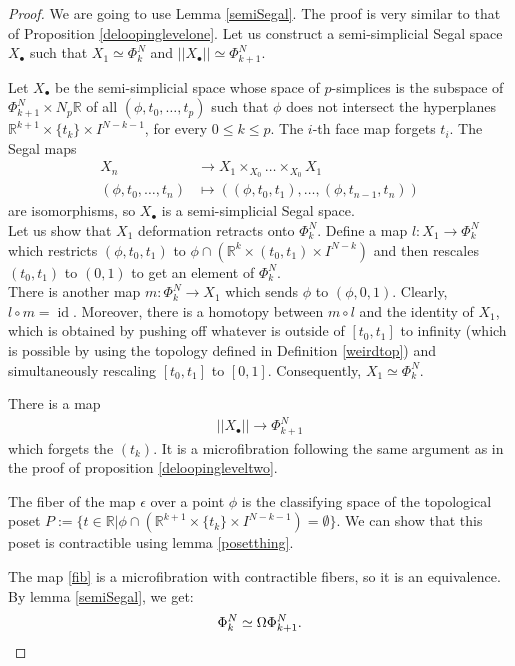 \documentclass[12pt]{amsart}
\theoremstyle{plain}
\newtheorem{lem}[teo]{Lemma}
\theoremstyle{definition}
\theoremstyle{remark}
\DeclareMathOperator{\id}{id}
\begin{document}
\begin{proof}
We are going to use Lemma \ref{semiSegal}.
The proof is very similar to that of Proposition \ref{deloopinglevelone}.
Let us construct a semi-simplicial Segal space $X_\bullet$ such that $X_1\simeq \Phi_{k}^N$ and $\vert\vert X_\bullet\vert\vert \simeq \Phi_{k+1}^N$.

Let $X_\bullet$ be the semi-simplicial space whose space of $p$-simplices is the subspace of $\Phi_{k+1}^N\times N_p\mathbb{R}$ of all $(\phi,t_0,\dots, t_p)$ such that $\phi$ does not intersect the hyperplanes $\mathbb{R}^{k+1}\times \{t_k\}\times I^{N-k-1}$, for every $0\leq k \leq p$.
The $i$-th face map forgets $t_i$.
The Segal maps
\begin{align*}
    X_n &\rightarrow X_1\times_{X_0}\dots\times_{X_0} X_1\\
    (\phi,t_0,\dots,t_n) &\mapsto ((\phi,t_0,t_1),\dots,(\phi,t_{n-1},t_n))
\end{align*}
are isomorphisms, so $X_\bullet$ is a semi-simplicial Segal space. \\
Let us show that $X_1$ deformation retracts onto $\Phi_{k}^N$. 
Define a map $l:X_1\rightarrow \Phi_{k}^N$ which restricts $(\phi,t_0,t_1)$ to $\phi\cap \left(\mathbb{R}^{k}\times (t_0,t_1) \times I^{N-k}\right)$ and then rescales $(t_0,t_1)$ to $(0,1)$ to get an element of $\Phi_{k}^N$.\\
There is another map $m:\Phi_{k}^N\rightarrow X_1$ which sends $\phi$ to $(\phi,0,1)$.
Clearly, $l\circ m = \id$.
Moreover, there is a homotopy between $m\circ l$ and the identity of $X_1$, which is obtained by pushing off whatever is outside of $[t_0,t_1]$ to infinity (which is possible by using the topology defined in Definition \ref{weirdtop}) and simultaneously rescaling $[t_0,t_1]$ to $[0,1]$.
Consequently, $X_1\simeq \Phi_{k}^N$.

There is a map
\begin{align}\label{fib}
    \vert\vert X_\bullet\vert\vert\rightarrow \Phi_{k+1}^N
\end{align}
which forgets the $(t_k)$. It is a microfibration following the same argument as in the proof of proposition \ref{deloopingleveltwo}.

The fiber of the map $\epsilon$ over a point $\phi$ is the classifying space of the topological poset $P:= \{t\in\mathbb{R}\vert \phi\cap\left(\mathbb{R}^{k+1}\times \{t_k\}\times I^{N-k-1}\right) = \emptyset\}$.
We can show that this poset is contractible using lemma \ref{posetthing}.

The map \ref{fib} is a microfibration with contractible fibers, so it is an equivalence.
By lemma \ref{semiSegal}, we get:
\[\Phi_k^N \simeq \Omega \Phi_{k+1}^N.\qedhere\] 
\end{proof}
\end{document}
